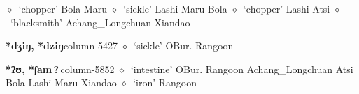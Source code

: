 \hspace{1ex}
         $\diamond$~`chopper'
         Bola 
\hspace{1ex}
         Maru 
\hspace{1ex}
         $\diamond$~`sickle'
         Lashi 
\hspace{1ex}
         Maru 
\hspace{1ex}
         Bola 
\hspace{1ex}
         $\diamond$~`chopper'
         Lashi 
\hspace{1ex}
         Atsi 
\hspace{1ex}
         $\diamond$~`blacksmith'
         Achang\_Longchuan 
\hspace{1ex}
         Xiandao 
  \item {\footnotesize \textbf{*dʒiŋ, *dziŋ}}{\tiny column-5427}
         $\diamond$~`sickle'
         OBur. 
\hspace{1ex}
         Rangoon 
  \item {\footnotesize \textbf{*ʔʊ, *ʃam\,?\,}}{\tiny column-5852}
         $\diamond$~`intestine'
         OBur. 
\hspace{1ex}
         Rangoon 
\hspace{1ex}
         Achang\_Longchuan 
\hspace{1ex}
         Atsi 
\hspace{1ex}
         Bola 
\hspace{1ex}
         Lashi 
\hspace{1ex}
         Maru 
\hspace{1ex}
         Xiandao 
\hspace{1ex}
         $\diamond$~`iron'
         Rangoon 
\hspace{1ex}

